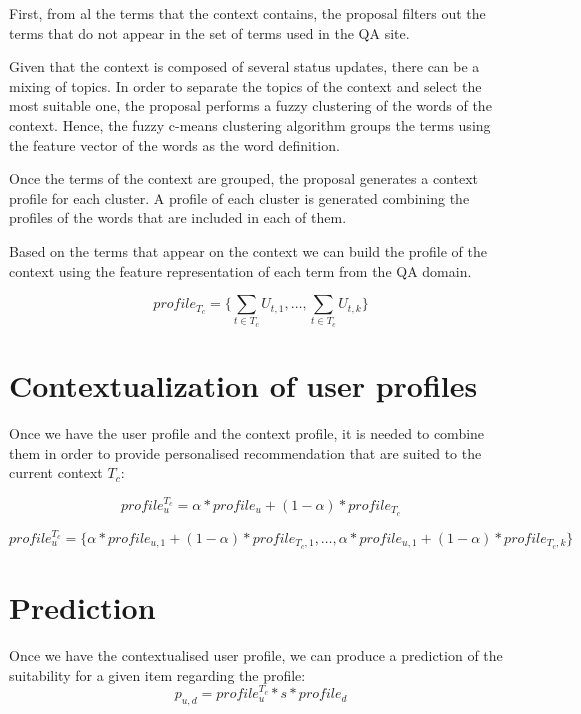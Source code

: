 \documentclass[preprint]{elsarticle}
\begin{document}
\begin{spacing}{2}
First, from al the terms that the context contains, the proposal filters out the terms that do not appear in the set of terms used in the QA site. 

Given that the context is composed of several status updates, there can be a mixing of topics. In order to separate the topics of the context and select the most suitable one, the proposal performs a fuzzy clustering of the words of the context. Hence, the fuzzy c-means clustering algorithm groups the terms using the feature vector of the words as the word definition.

Once the terms of the context are grouped, the proposal generates a context profile for each cluster. A profile of each cluster is generated combining the profiles of the words that are included in each of them.

Based on the terms that appear on the context we can build the profile of the context using the feature representation of each term from the QA domain.

\begin{equation}
	profile_{T_c} = \{\sum_{t \in T_c} U_{t,1}, \dots, \sum_{t \in T_c} U_{t,k} \}
\end{equation}

\section{Contextualization of user profiles}

Once we have the user profile and the context profile, it is needed to combine them in order to provide personalised recommendation that are suited to the current context $T_c$:

\begin{equation}
	profile_u^{T_c} = \alpha * profile_u + (1- \alpha )*profile_{T_c}
\end{equation}

\begin{equation}
	profile_u^{T_c} = \{ \alpha * profile_{u,1} + (1- \alpha ) * profile_{T_c,1},\dots, \alpha * profile_{u,1} + ( 1 - \alpha ) * profile_{T_c,k} \}
\end{equation}

\section{Prediction}

Once we have the contextualised user profile, we can produce a prediction of the suitability for a given item regarding the profile:
\begin{equation}
	p_{u,d} = profile_u^{T_c}*s*profile_d
\end{equation}


\end{spacing}
\end{document}
